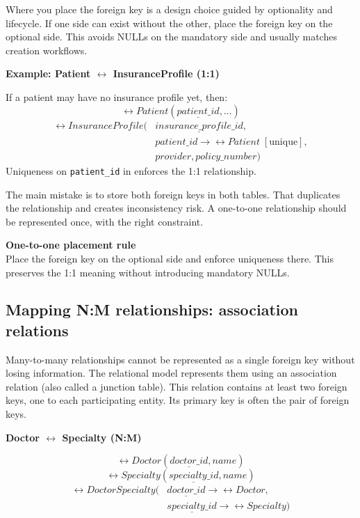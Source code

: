 Where you place the foreign key is a design choice guided by optionality and lifecycle.
If one side can exist without the other, place the foreign key on the optional side.
This avoids NULLs on the mandatory side and usually matches creation workflows.

\begin{examplebox}
\textbf{Example: Patient \(\leftrightarrow\) InsuranceProfile (1:1)}\par\smallskip
If a patient may have no insurance profile yet, then:
\[
\rel{Patient}(\underline{patient\_id}, \dots)
\]
\[
\begin{aligned}
\rel{InsuranceProfile}(&\underline{insurance\_profile\_id}, \\
&patient\_id \rightarrow \rel{Patient} \;[\text{unique}], \\
&provider, policy\_number)
\end{aligned}
\]
Uniqueness on \texttt{patient\_id} in  enforces the 1:1 relationship.
\end{examplebox}

The main mistake is to store both foreign keys in both tables.
That duplicates the relationship and creates inconsistency risk.
A one-to-one relationship should be represented once, with the right constraint.

\begin{principlebox}
\textbf{One-to-one placement rule}\\
Place the foreign key on the optional side and enforce uniqueness there.
This preserves the 1:1 meaning without introducing mandatory NULLs.
\end{principlebox}

\subsection{Mapping N:M relationships: association relations}
Many-to-many relationships cannot be represented as a single foreign key without losing information.
The relational model represents them using an association relation (also called a junction table).
This relation contains at least two foreign keys, one to each participating entity.
Its primary key is often the pair of foreign keys.

\begin{examplebox}
\textbf{Doctor \(\leftrightarrow\) Specialty (N:M)}\par\smallskip
\[
\rel{Doctor}(\underline{doctor\_id}, name)
\]
\[
\rel{Specialty}(\underline{specialty\_id}, name)
\]
\[
\begin{aligned}
\rel{DoctorSpecialty}(&\underline{doctor\_id} \rightarrow \rel{Doctor}, \\
&\underline{specialty\_id} \rightarrow \rel{Specialty})
\end{aligned}
\]
\end{examplebox}

